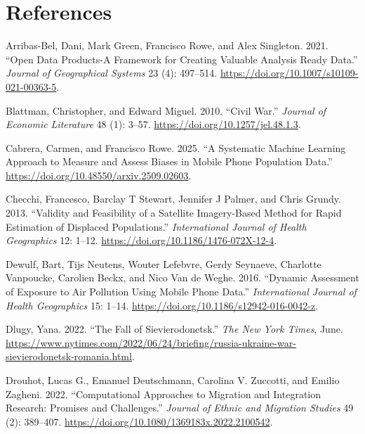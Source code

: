 \documentclass[
  sn-nature,
  11pt,
]{sn-jnl}
\newlength{\cslhangindent}
\newenvironment{CSLReferences}[2] %
 {\begin{list}{}{%
  \setlength{\itemindent}{0pt}
  \setlength{\leftmargin}{0pt}
  \setlength{\parsep}{0pt}
  \ifodd #1
   \setlength{\leftmargin}{\cslhangindent}
   \setlength{\itemindent}{-1\cslhangindent}
  \fi
  \setlength{\itemsep}{#2\baselineskip}}}
 {\end{list}}
\begin{document}
\section*{References}\label{references}

\label{refs}
\begin{CSLReferences}{1}{0}
Arribas-Bel, Dani, Mark Green, Francisco Rowe, and Alex Singleton. 2021.
{``Open Data Products-A Framework for Creating Valuable Analysis Ready
Data.''} \emph{Journal of Geographical Systems} 23 (4): 497--514.
\url{https://doi.org/10.1007/s10109-021-00363-5}.

Blattman, Christopher, and Edward Miguel. 2010. {``Civil War.''}
\emph{Journal of Economic Literature} 48 (1): 3--57.
\url{https://doi.org/10.1257/jel.48.1.3}.

Cabrera, Carmen, and Francisco Rowe. 2025. {``A Systematic Machine
Learning Approach to Measure and Assess Biases in Mobile Phone
Population Data.''} \url{https://doi.org/10.48550/arxiv.2509.02603}.

Checchi, Francesco, Barclay T Stewart, Jennifer J Palmer, and Chris
Grundy. 2013. {``Validity and Feasibility of a Satellite Imagery-Based
Method for Rapid Estimation of Displaced Populations.''}
\emph{International Journal of Health Geographics} 12: 1--12.
\url{https://doi.org/10.1186/1476-072X-12-4}.

Dewulf, Bart, Tijs Neutens, Wouter Lefebvre, Gerdy Seynaeve, Charlotte
Vanpoucke, Carolien Beckx, and Nico Van de Weghe. 2016. {``Dynamic
Assessment of Exposure to Air Pollution Using Mobile Phone Data.''}
\emph{International Journal of Health Geographics} 15: 1--14.
\url{https://doi.org/10.1186/s12942-016-0042-z}.

Dlugy, Yana. 2022. {``The Fall of {Sievierodonetsk}.''} \emph{{The New
York Times}}, June.
\url{https://www.nytimes.com/2022/06/24/briefing/russia-ukraine-war-sievierodonetsk-romania.html}.

Drouhot, Lucas G., Emanuel Deutschmann, Carolina V. Zuccotti, and Emilio
Zagheni. 2022. {``Computational Approaches to Migration and Integration
Research: Promises and Challenges.''} \emph{Journal of Ethnic and
Migration Studies} 49 (2): 389--407.
\url{https://doi.org/10.1080/1369183x.2022.2100542}.


\end{CSLReferences}
\end{document}
